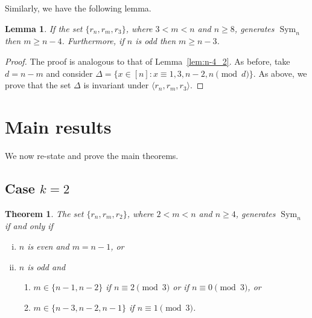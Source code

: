\documentclass[
final
]{dmtcs-episciences}
\newtheorem{lemma}{Lemma}
\newtheorem{theorem}{Theorem}
\DeclareMathOperator{\Sym}{\mathrm{Sym}}
\begin{document}
Similarly, we have the following lemma. 


\begin{lemma}\label{lem:n-4_3}
    If the set $\{r_n,r_m,r_3\}$, where $3<m<n$ and $n\geqslant 8$, generates $\Sym_n$ then $m\geqslant n-4$. Furthermore, if $n$ is odd then $m\geqslant n-3$.
\end{lemma}

\begin{proof}
The proof is analogous to that of Lemma~\ref{lem:n-4_2}. As before, take $d=n-m$ and consider $\Delta = \{x\in[n]:x\equiv1,3,n-2,n\pmod d\}$. As above, we prove that the set $\Delta$ is invariant under $\langle r_n,r_m,r_3\rangle$.
\end{proof}

\section{Main results}\label{sec:results}

We now re-state and prove the main theorems. 

\subsection{Case $k=2$}\label{k23}

\medskip
\begin{theorem}\label{thm:2}
    The set $\{r_n,r_m,r_2\}$, where $2<m<n$ and $n\geqslant 4$, generates $\Sym_n$ if and only if
    \begin{enumerate}[(i)]
        \item $n$ is even and $m=n-1$, or 
        \item $n$ is odd and 
        \begin{enumerate}
            \item $m\in\{n-1,n-2\}$ if $n\equiv2\pmod 3$ or if $n\equiv0\pmod 3$, or
            \item $m\in\{n-3,n-2,n-1\}$ if $n\equiv 1\pmod 3$. 
        \end{enumerate}
    \end{enumerate}
\end{theorem}
\end{document}
